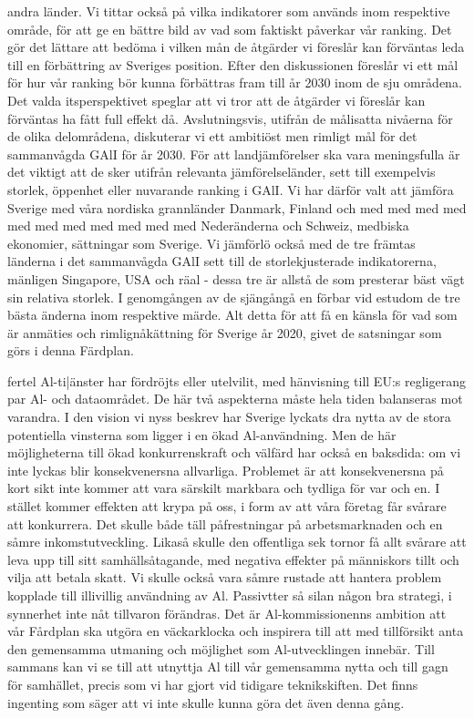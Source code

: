 {{{{{{{{{{{{{{{{andra länder. Vi tittar också på vilka indikatorer som används inom respektive område, för att ge en bättre bild av vad som faktiskt påverkar vår ranking. Det gör det lättare att bedöma i vilken mån de åtgärder vi föreslår kan förväntas leda till en förbättring av Sveriges position. Efter den diskussionen föreslår vi ett mål för hur vår ranking bör kunna förbättras fram till år 2030 inom de sju områdena. Det valda itsperspektivet speglar att vi tror att de åtgärder vi föreslår kan förväntas ha fått full effekt då. Avslutningsvis, utifrån de målisatta nivåerna för de olika delområdena, diskuterar vi ett ambitiöst men rimligt mål för det sammanvågda GAlI för år 2030.
För att landjämförelser ska vara meningsfulla är det viktigt att de sker utifrån relevanta jämförelseländer, sett till exempelvis storlek, öppenhet eller nuvarande ranking i GAlI. Vi har därför valt att jämföra Sverige med våra nordiska grannländer Danmark, Finland och med med med med med med med med med med med Nederänderna och Schweiz, medbiska ekonomier, sättningar som Sverige. Vi jämförlö också med de tre främtas länderna i det sammanvågda GAlI sett till de storlekjusterade indikatorerna, mänligen Singapore, USA och räal - dessa tre är allstå de som presterar bäst vägt sin relativa storlek. I genomgången av de sjängångå en förbar vid estudom de tre bästa änderna inom respektive märde. Alt detta för att få en känsla för vad som är anmäties och rimlignåkättning för Sverige år 2020, givet de satsningar som görs i denna Färdplan.

fertel Al-ti|änster har fördröjts eller utelvilit, med hänvisning till EU:s regligerang par Al- och dataområdet. De här två aspekterna måste hela tiden balanseras mot varandra.
I den vision vi nyss beskrev har Sverige lyckats dra nytta av de stora potentiella vinsterna som ligger i en ökad Al-användning. Men de här möjligheterna till ökad konkurrenskraft och välfärd har också en baksdida: om vi inte lyckas blir konsekvenersna allvarliga. Problemet är att konsekvenersna på kort sikt inte kommer att vara särskilt markbara och tydliga för var och en. I stället kommer effekten att krypa på oss, i form av att våra företag får svårare att konkurrera. Det skulle både täll påfrestningar på arbetsmarknaden och en såmre inkomstutveckling. Likaså skulle den offentliga sek tornor få allt svårare att leva upp till sitt samhällsåtagande, med negativa effekter på människors tillt och vilja att betala skatt. Vi skulle också vara såmre rustade att hantera problem kopplade till illivillig användning av Al.
Passivtter så silan någon bra strategi, i synnerhet inte nåt tillvaron förändras. Det är Al-kommissionenns ambition att vår Fårdplan ska utgöra en väckarklocka och inspirera till att med tillförsikt anta den gemensamma utmaning och möjlighet som Al-utvecklingen innebär. Till sammans kan vi se till att utnyttja Al till vår gemensamma nytta och till gagn för samhället, precis som vi har gjort vid tidigare teknikskiften. Det finns ingenting som säger att vi inte skulle kunna göra det även denna gång.

}}}}}}}}}}}}}}}}
